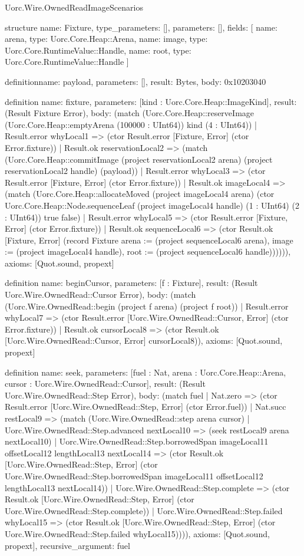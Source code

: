\begin{lexlean}{Uorc.Wire.OwnedReadImageScenarios}
\begin{semanticmodule}
structure{
  name: Fixture,
  type_parameters: [],
  parameters: [],
  fields: [
    {name: arena, type: Uorc.Core.Heap::Arena},
    {name: image, type: Uorc.Core.RuntimeValue::Handle},
    {name: root, type: Uorc.Core.RuntimeValue::Handle}
  ]
}

definition{name: payload, parameters: [], result: Bytes, body: 0x10203040}

definition{
  name: fixture,
  parameters: [kind : Uorc.Core.Heap::ImageKind],
  result: (Result Fixture Error),
  body: (match (Uorc.Core.Heap::reserveImage (Uorc.Core.Heap::emptyArena (100000 : UInt64)) kind (4 : UInt64))
    | Result.error whyLocal1 => (ctor Result.error [Fixture, Error] (ctor Error.fixture))
    | Result.ok reservationLocal2 => (match (Uorc.Core.Heap::commitImage (project reservationLocal2 arena) (project reservationLocal2 handle) (payload))
      | Result.error whyLocal3 => (ctor Result.error [Fixture, Error] (ctor Error.fixture))
      | Result.ok imageLocal4 => (match (Uorc.Core.Heap::allocateMoved (project imageLocal4 arena) (ctor Uorc.Core.Heap::Node.sequenceLeaf (project imageLocal4 handle) (1 : UInt64) (2 : UInt64)) true false)
        | Result.error whyLocal5 => (ctor Result.error [Fixture, Error] (ctor Error.fixture))
        | Result.ok sequenceLocal6 => (ctor Result.ok [Fixture, Error] (record Fixture {arena := (project sequenceLocal6 arena), image := (project imageLocal4 handle), root := (project sequenceLocal6 handle)}))))),
  axioms: [Quot.sound, propext]
}

definition{
  name: beginCursor,
  parameters: [f : Fixture],
  result: (Result Uorc.Wire.OwnedRead::Cursor Error),
  body: (match (Uorc.Wire.OwnedRead::begin (project f arena) (project f root))
    | Result.error whyLocal7 => (ctor Result.error [Uorc.Wire.OwnedRead::Cursor, Error] (ctor Error.fixture))
    | Result.ok cursorLocal8 => (ctor Result.ok [Uorc.Wire.OwnedRead::Cursor, Error] cursorLocal8)),
  axioms: [Quot.sound, propext]
}

definition{
  name: seek,
  parameters: [fuel : Nat, arena : Uorc.Core.Heap::Arena, cursor : Uorc.Wire.OwnedRead::Cursor],
  result: (Result Uorc.Wire.OwnedRead::Step Error),
  body: (match fuel
    | Nat.zero => (ctor Result.error [Uorc.Wire.OwnedRead::Step, Error] (ctor Error.fuel))
    | Nat.succ restLocal9 => (match (Uorc.Wire.OwnedRead::step arena cursor)
      | Uorc.Wire.OwnedRead::Step.advanced nextLocal10 => (seek restLocal9 arena nextLocal10)
      | Uorc.Wire.OwnedRead::Step.borrowedSpan imageLocal11 offsetLocal12 lengthLocal13 nextLocal14 => (ctor Result.ok [Uorc.Wire.OwnedRead::Step, Error] (ctor Uorc.Wire.OwnedRead::Step.borrowedSpan imageLocal11 offsetLocal12 lengthLocal13 nextLocal14))
      | Uorc.Wire.OwnedRead::Step.complete => (ctor Result.ok [Uorc.Wire.OwnedRead::Step, Error] (ctor Uorc.Wire.OwnedRead::Step.complete))
      | Uorc.Wire.OwnedRead::Step.failed whyLocal15 => (ctor Result.ok [Uorc.Wire.OwnedRead::Step, Error] (ctor Uorc.Wire.OwnedRead::Step.failed whyLocal15)))),
  axioms: [Quot.sound, propext],
  recursive_argument: fuel
}


\end{semanticmodule}
\end{lexlean}
